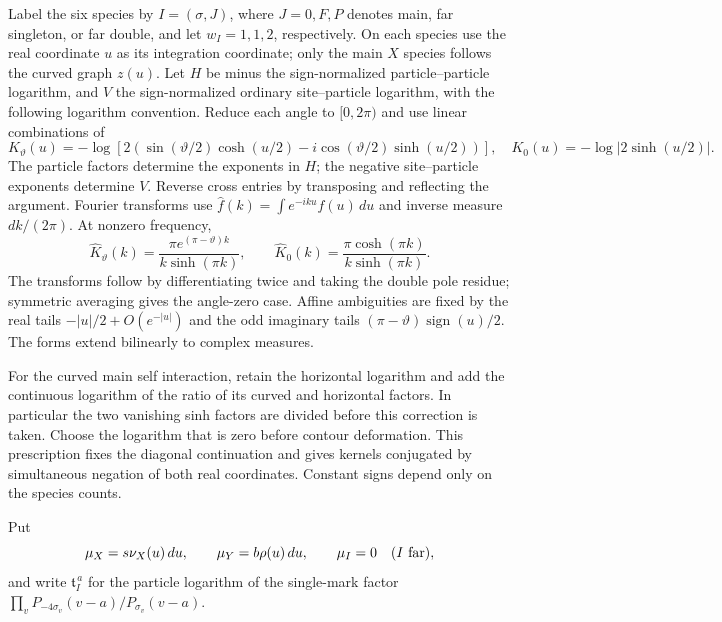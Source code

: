 Label the six species by \(I=(\sigma,J)\), where \(J=0,F,P\)
denotes main, far singleton, or far double, and let
\(w_I=1,1,2\), respectively.  On each species use the real coordinate
\(u\) as its integration coordinate; only the main \(X\) species
follows the curved graph \(z(u)\).
Let \(H\) be minus the sign-normalized particle--particle logarithm,
and \(V\) the sign-normalized ordinary site--particle logarithm,
with the following logarithm convention. Reduce each angle to
$[0,2\pi)$ and use linear combinations of
\[
 K_\vartheta(u)=-\log\!\left[2\left(\sin(\vartheta/2)\cosh(u/2)
       -i\cos(\vartheta/2)\sinh(u/2)\right)\right],\quad
 K_0(u)=-\log|2\sinh(u/2)|.
\]
The particle factors determine the exponents in $H$; the negative
site--particle exponents determine $V$. Reverse cross entries by
transposing and reflecting the argument. Fourier transforms use
$\widehat f(k)=\int e^{-iku}f(u)\,du$ and inverse measure $dk/(2\pi)$.
At nonzero frequency,
\[
 \widehat K_\vartheta(k)=\frac{\pi e^{(\pi-\vartheta)k}}
                              {k\sinh(\pi k)},\qquad
 \widehat K_0(k)=\frac{\pi\cosh(\pi k)}{k\sinh(\pi k)}.
\]
The transforms follow by differentiating twice and taking the double
pole residue; symmetric averaging gives the angle-zero case.
Affine ambiguities are fixed by the real tails $-|u|/2+O(e^{-|u|})$
and the odd imaginary tails
$(\pi-\vartheta)\operatorname{sign}(u)/2$. The forms extend
bilinearly to complex measures.

For the curved main self interaction, retain the horizontal
logarithm and add the continuous logarithm of the ratio of its
curved and horizontal factors.  In particular the two vanishing
sinh factors are divided before this correction is taken.
Choose the logarithm that is zero before contour deformation.
This prescription fixes the diagonal continuation and gives kernels
conjugated by simultaneous negation of both real coordinates.
Constant signs depend only on the species counts.

Put
\[
 \mu_X=s\nu_X(u)\,du,\qquad
 \mu_Y=b\rho(u)\,du,\qquad \mu_I=0\quad(I\ {\rm far}),
\]
and write \(\mathfrak t_I^{\,a}\) for the particle logarithm of the
single-mark factor
\(\prod_vP_{-4\sigma_v}(v-a)/P_{\sigma_v}(v-a)\).

